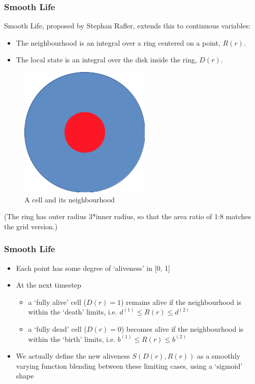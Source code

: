 \subsubsection{Smooth Life}\label{smooth-life-1}

Smooth Life, proposed by Stephan Rafler, extends this to continuous
variables:

\begin{itemize}
\itemsep1pt\parskip0pt
\item
  The neighbourhood is an integral over a ring centered on a point,
  $R(r)$.
\item
  The local state is an integral over the disk inside the ring, $D(r)$.
\end{itemize}

\begin{figure}[htbp]
\centering
\includegraphics{93MPIExample/figures/cell_neighbourhood.png}
\caption{A cell and its neighbourhood}
\end{figure}

(The ring has outer radius 3*inner radius, so that the area ratio of 1:8
matches the grid version.)

\subsubsection{Smooth Life}\label{smooth-life-2}

\begin{itemize}
\itemsep1pt\parskip0pt
\item
  Each point has some degree of `aliveness' in {[}0, 1{]}
\item
  At the next timestep

  \begin{itemize}
  \itemsep1pt\parskip0pt
  \item
    a `fully alive' cell ($D(r)=1$) remains alive if the neighbourhood
    is within the `death' limits, i.e. $d^{(1)} \leq R(r) \leq d^{(2)}$
  \item
    a `fully dead' cell ($D(r)=0$) becomes alive if the neighbourhood is
    within the `birth' limits, i.e. $b^{(1)} \leq R(r) \leq b^{(2)}$
  \end{itemize}
\item
  We actually define the new aliveness $S(D(r),R(r))$ as a smoothly
  varying function blending between these limiting cases, using a
  `sigmoid' shape
\end{itemize}

